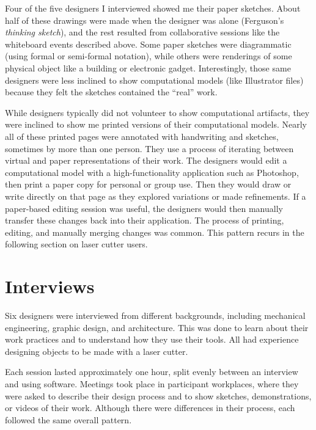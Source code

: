 Four of the five designers I interviewed showed me their paper
sketches. About half of these drawings were made when the designer was
alone (Ferguson's \textit{thinking sketch}), and the rest resulted
from collaborative sessions like the whiteboard events described
above. Some paper sketches were diagrammatic (using formal or
semi-formal notation), while others were renderings of some physical
object like a building or electronic gadget. Interestingly, those same
designers were less inclined to show computational models (like
Illustrator files) because they felt the sketches contained the
``real'' work.

While designers typically did not volunteer to show computational
artifacts, they were inclined to show me printed versions of their
computational models. Nearly all of these printed pages were annotated
with handwriting and sketches, sometimes by more than one person. They
use a process of iterating between virtual and paper representations
of their work. The designers would edit a computational model with a
high-functionality application such as Photoshop, then print a paper
copy for personal or group use. Then they would draw or write directly
on that page as they explored variations or made refinements. If a
paper-based editing session was useful, the designers would then
manually transfer these changes back into their application. The
process of printing, editing, and manually merging changes was
common. This pattern recurs in the following section on laser cutter
users.

\section{Interviews}
\label{sec:formative-interviews}



Six designers were interviewed from different backgrounds, including
mechanical engineering, graphic design, and architecture. This was
done to learn about their work practices and to understand how they
use their tools. All had experience designing objects to be made with
a laser cutter.

Each session lasted approximately one hour, split evenly between an
interview and using software. Meetings took place in participant
workplaces, where they were asked to describe their design process and
to show sketches, demonstrations, or videos of their work. Although
there were differences in their process, each followed the same
overall pattern.

